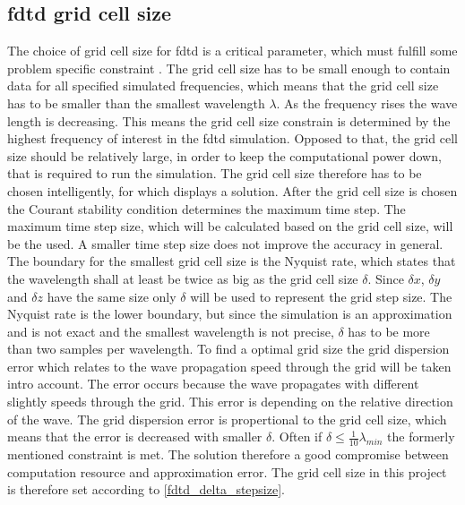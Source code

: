 \subsection{\gls{fdtd} grid cell size}

The choice of grid cell size for \gls{fdtd} is a critical parameter, which must fulfill some problem specific constraint \citep{Kunz1993}. The grid cell size has to be small enough to contain data for all specified simulated frequencies, which means that the grid cell size has to be smaller than the smallest wavelength $\lambda$. As the frequency rises the wave length is decreasing. This means the grid cell size constrain is determined by the highest frequency of interest in the \gls{fdtd} simulation. Opposed to that, the grid cell size should be relatively large, in order to keep the computational power down, that is required to run the simulation. The grid cell size therefore has to be chosen intelligently, for which \citep{Kunz1993} displays a solution. After the grid cell size is chosen the Courant stability condition determines the maximum time step. The maximum time step size, which will be calculated based on the grid cell size, will be the used. A smaller time step size does not improve the accuracy in general. \\


The boundary for the smallest grid cell size is the Nyquist rate, which states that the wavelength shall at least be twice as big as the grid cell size $\delta$. Since $\delta x$, $\delta y$ and $\delta z$ have the same size only $\delta$ will be used to represent the grid step size. The Nyquist rate is the lower boundary, but since the simulation is an approximation and is not exact and the smallest wavelength is not precise, $\delta$ has to be more than two samples per wavelength. To find a optimal grid size the grid dispersion error which relates to the wave propagation speed through the grid will be taken intro account. The error occurs because the wave propagates with different slightly speeds through the grid. This error is depending on the relative direction of the wave. The grid dispersion error is propertional to the grid cell size, which means that the error is decreased with smaller $\delta$\citep{Kunz1993}. 
Often if $ \delta \leq \frac{1}{10}\lambda_{min}$ the formerly mentioned constraint is met. The solution therefore a good compromise between computation resource and approximation error. The grid cell size in this project is therefore set according to \autoref{fdtd_delta_stepsize}.

